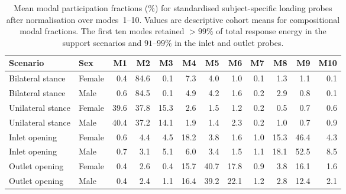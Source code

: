 \documentclass[openacc]{rsproca_new}
\begin{document}
\begin{table}[p]
\centering
\caption{Mean modal participation fractions (\%) for standardised subject-specific loading probes after normalisation over modes~1--10. Values are descriptive cohort means for compositional modal fractions. The first ten modes retained $>99\%$ of total response energy in the support scenarios and $91$--$99\%$ in the inlet and outlet probes.}
\label{tab:loadcases}
\begin{tabular}{llrrrrrrrrrr}
\toprule
Scenario & Sex & M1 & M2 & M3 & M4 & M5 & M6 & M7 & M8 & M9 & M10 \\
\midrule
Bilateral stance & Female & 0.4 & 84.6 & 0.1 & 7.3 & 4.0 & 1.0 & 0.1 & 1.3 & 1.1 & 0.1 \\
Bilateral stance & Male   & 0.6 & 84.5 & 0.1 & 4.9 & 4.2 & 1.6 & 0.2 & 2.9 & 0.8 & 0.1 \\
Unilateral stance & Female & 39.6 & 37.8 & 15.3 & 2.6 & 1.5 & 1.2 & 0.2 & 0.5 & 0.7 & 0.6 \\
Unilateral stance & Male   & 40.4 & 37.2 & 14.1 & 1.9 & 1.4 & 2.3 & 0.2 & 1.0 & 0.7 & 0.9 \\
Inlet opening & Female & 0.6 & 4.4 & 4.5 & 18.2 & 3.8 & 1.6 & 1.0 & 15.3 & 46.4 & 4.3 \\
Inlet opening & Male   & 0.7 & 3.1 & 5.1 & 6.0 & 3.4 & 1.5 & 1.1 & 18.1 & 52.5 & 8.5 \\
Outlet opening & Female & 0.4 & 2.6 & 0.4 & 15.7 & 40.7 & 17.8 & 0.9 & 3.8 & 16.1 & 1.6 \\
Outlet opening & Male   & 0.4 & 2.4 & 1.1 & 16.4 & 39.2 & 22.1 & 1.2 & 2.8 & 12.4 & 2.1 \\
\bottomrule
\end{tabular}
\end{table}
\end{document}
